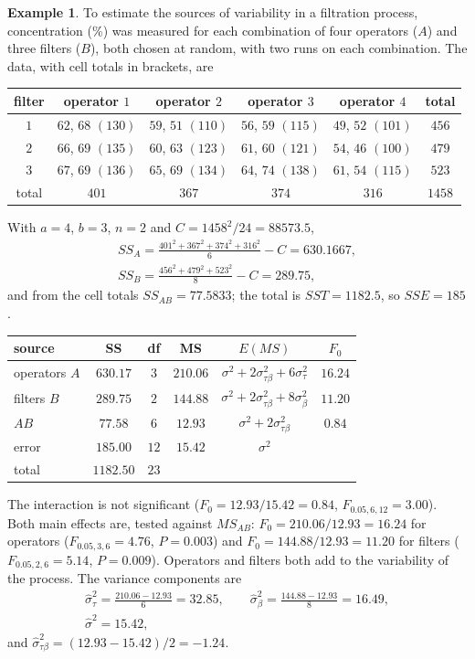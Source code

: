 \documentclass[11pt,a4paper]{article}
\numberwithin{equation}{section}
\theoremstyle{definition}
\newtheorem{exa}[thm]{Example}
\begin{document}
\begin{exa}\label{exa:filter-random}
To estimate the sources of variability in a filtration process, concentration (\%) was measured for each combination of four operators ($A$)
and three filters ($B$), both chosen at random, with two runs on each combination. The data, with cell totals in brackets, are
\begin{center}
\begin{tabular}{c|cccc|c}
filter & operator $1$ & operator $2$ & operator $3$ & operator $4$ & total \\
\hline
$1$ & $62$, $68$ $(130)$ & $59$, $51$ $(110)$ & $56$, $59$ $(115)$ & $49$, $52$ $(101)$ & $456$ \\
$2$ & $66$, $69$ $(135)$ & $60$, $63$ $(123)$ & $61$, $60$ $(121)$ & $54$, $46$ $(100)$ & $479$ \\
$3$ & $67$, $69$ $(136)$ & $65$, $69$ $(134)$ & $64$, $74$ $(138)$ & $61$, $54$ $(115)$ & $523$ \\
\hline
total & $401$ & $367$ & $374$ & $316$ & $1458$
\end{tabular}
\end{center}
With $a = 4$, $b = 3$, $n = 2$ and $C = 1458^2/24 = 88573.5$,
\begin{gather*}
SS_A = \frac{401^2 + 367^2 + 374^2 + 316^2}6 - C = 630.1667 , \\
SS_B = \frac{456^2 + 479^2 + 523^2}8 - C = 289.75 ,
\end{gather*}
and from the cell totals $SS_{AB} = 77.5833$; the total is $SST = 1182.5$, so $SSE = 185$.
\begin{center}
\begin{tabular}{l|ccccc}
source & SS & df & MS & $E(MS)$ & $F_0$ \\
\hline
operators $A$ & $630.17$ & $3$ & $210.06$ & $\sigma^2 + 2\sigma^2_{\tau\beta} + 6\sigma^2_\tau$ & $16.24$ \\
filters $B$ & $289.75$ & $2$ & $144.88$ & $\sigma^2 + 2\sigma^2_{\tau\beta} + 8\sigma^2_\beta$ & $11.20$ \\
$AB$ & $77.58$ & $6$ & $12.93$ & $\sigma^2 + 2\sigma^2_{\tau\beta}$ & $0.84$ \\
error & $185.00$ & $12$ & $15.42$ & $\sigma^2$ & \\
\hline
total & $1182.50$ & $23$ & & &
\end{tabular}
\end{center}
The interaction is not significant ($F_0 = 12.93/15.42 = 0.84$, $F_{0.05, 6, 12} = 3.00$). Both main effects are, tested against $MS_{AB}$: $F_0 = 210.06/12.93 = 16.24$ for
operators ($F_{0.05, 3, 6} = 4.76$, $P = 0.003$) and $F_0 = 144.88/12.93 = 11.20$ for filters ($F_{0.05, 2, 6} = 5.14$, $P = 0.009$). Operators and filters both add to the variability
of the process. The variance components are
\begin{gather*}
\hat\sigma^2_\tau = \frac{210.06 - 12.93}6 = 32.85 , \qquad \hat\sigma^2_\beta = \frac{144.88 - 12.93}8 = 16.49 , \\
\hat\sigma^2 = 15.42 ,
\end{gather*}
and $\hat\sigma^2_{\tau\beta} = (12.93 - 15.42)/2 = -1.24$.


\end{exa}
\end{document}
